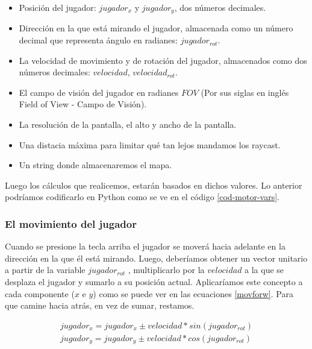 \begin{itemize}
	\item Posición del jugador: $jugador_x$ y $jugador_y$, dos números decimales.
	\item Dirección en la que está mirando el jugador, almacenada como un número decimal que representa ángulo en radianes: $jugador_{rot}$.
	\item La velocidad de movimiento y de rotación del jugador, almacenados como dos números decimales: $velocidad$,  $velocidad_{rot}$. 
	\item El campo de visión del jugador en radianes $FOV$ (Por sus siglas en inglés Field of View - Campo de Visión).
	\item La resolución de la pantalla, el alto y ancho de la pantalla.
	\item Una distacia máxima para limitar qué tan lejos mandamos los raycast.
	\item Un string donde almacenaremos el mapa.
\end{itemize}

Luego los cálculos que realicemos, estarán basados en dichos valores. Lo anterior podríamos codificarlo en Python como se ve en el código \ref{cod-motor-vars}.



\subsubsection{El movimiento del jugador}

Cuando se presione la tecla arriba el jugador se moverá hacia adelante en la dirección en la que él está mirando. Luego, deberíamos obtener un vector unitario a partir de la variable $jugador_{rot}$ , multiplicarlo por la $velocidad$ a la que se desplaza el jugador y sumarlo a su posición actual. Aplicaríamos este concepto a cada componente ($x$ e $y$) como se puede ver en las ecuaciones \ref{movforw}. Para que camine hacia atrás, en vez de sumar, restamos. 

\begin{equation}
\begin{aligned}
\label{movforw}
jugador_x = jugador_x \pm velocidad * sin(jugador_{rot})  \\
jugador_y = jugador_y \pm velocidad * cos(jugador_{rot})
\end{aligned}
\end{equation}

